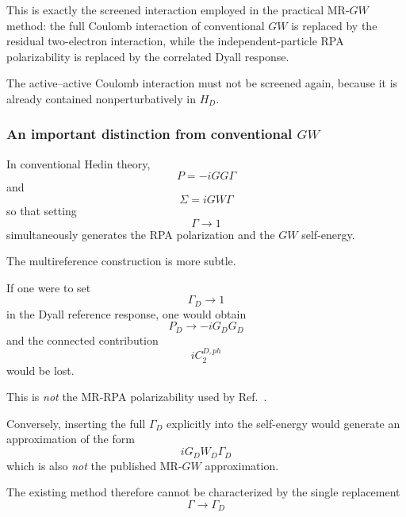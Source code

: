\documentclass[aip,jcp,reprint,noshowkeys,superscriptaddress]{revtex4-1}
\begin{document}
This is exactly the screened interaction employed in the practical
MR-$GW$ method: the full Coulomb interaction of conventional $GW$ is
replaced by the residual two-electron interaction, while the
independent-particle RPA polarizability is replaced by the correlated
Dyall response.

The active--active Coulomb interaction must not be screened again,
because it is already contained nonperturbatively in $H_D$.


\subsubsection{An important distinction from conventional \texorpdfstring{$GW$}{GW}}

In conventional Hedin theory,
\begin{equation}
  P=-iGG\Gamma
\end{equation}
and
\begin{equation}
  \Sigma=iGW\Gamma
\end{equation}
so that setting
\begin{equation}
  \Gamma\rightarrow1
\end{equation}
simultaneously generates the RPA polarization and the $GW$ self-energy.

The multireference construction is more subtle.

If one were to set
\begin{equation}
  \Gamma_D\rightarrow1
\end{equation}
in the Dyall reference response, one would obtain
\begin{equation}
  P_D
  \longrightarrow
  -iG_DG_D
\end{equation}
and the connected contribution
\begin{equation}
  iC_2^{D,ph}
\end{equation}
would be lost.

This is \emph{not} the MR-RPA polarizability used by
Ref.~\cite{WangFangLi2026}.

Conversely, inserting the full $\Gamma_D$ explicitly into the
self-energy would generate an approximation of the form
\begin{equation}
  iG_DW_D\Gamma_D
\end{equation}
which is also \emph{not} the published MR-$GW$ approximation.

The existing method therefore cannot be characterized by the single
replacement
\begin{equation}
  \Gamma
  \rightarrow
  \Gamma_D
\end{equation}
\end{document}
